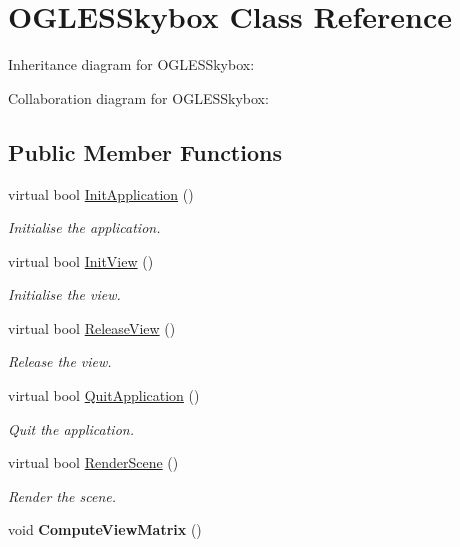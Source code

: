 \hypertarget{class_o_g_l_e_s_skybox}{\section{O\+G\+L\+E\+S\+Skybox Class Reference}
\label{class_o_g_l_e_s_skybox}
}


Inheritance diagram for O\+G\+L\+E\+S\+Skybox\+:


Collaboration diagram for O\+G\+L\+E\+S\+Skybox\+:
\subsection*{Public Member Functions}
\begin{DoxyCompactItemize}
\item 
virtual bool \hyperlink{class_o_g_l_e_s_skybox_a553c83ac7735b271ae7dffe17a35b91a}{Init\+Application} ()
\begin{DoxyCompactList}\small\item\em Initialise the application. \end{DoxyCompactList}\item 
virtual bool \hyperlink{class_o_g_l_e_s_skybox_aec4465067bcb94fcc3d7e0b4112446c6}{Init\+View} ()
\begin{DoxyCompactList}\small\item\em Initialise the view. \end{DoxyCompactList}\item 
virtual bool \hyperlink{class_o_g_l_e_s_skybox_a05c4fdbc43a68a7f4286496dfc421c3e}{Release\+View} ()
\begin{DoxyCompactList}\small\item\em Release the view. \end{DoxyCompactList}\item 
virtual bool \hyperlink{class_o_g_l_e_s_skybox_a6b6af6fed34f4374e4adf10702cc21cd}{Quit\+Application} ()
\begin{DoxyCompactList}\small\item\em Quit the application. \end{DoxyCompactList}\item 
virtual bool \hyperlink{class_o_g_l_e_s_skybox_ad981aedf6d53fd364e268dc56231ee6f}{Render\+Scene} ()
\begin{DoxyCompactList}\small\item\em Render the scene. \end{DoxyCompactList}\item 
\hypertarget{class_o_g_l_e_s_skybox_a702fa9dc5a7b3631d60345cb17877455}{void {\bfseries Compute\+View\+Matrix} ()}\label{class_o_g_l_e_s_skybox_a702fa9dc5a7b3631d60345cb17877455}


\end{DoxyCompactItemize}
